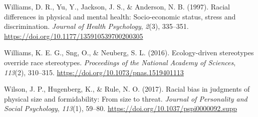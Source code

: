 \documentclass[
  english,
  man]{apa6}
\begin{document}
\leavevmode\hypertarget{ref-Williams1997}{}%
Williams, D. R., Yu, Y., Jackson, J. S., \& Anderson, N. B. (1997). Racial differences in physical and mental health: Socio-economic status, stress and discrimination. \emph{Journal of Health Psychology}, \emph{2}(3), 335--351. \url{https://doi.org/10.1177/135910539700200305}

\leavevmode\hypertarget{ref-Williams2016}{}%
Williams, K. E. G., Sng, O., \& Neuberg, S. L. (2016). Ecology-driven stereotypes override race stereotypes. \emph{Proceedings of the National Academy of Sciences}, \emph{113}(2), 310--315. \url{https://doi.org/10.1073/pnas.1519401113}

\leavevmode\hypertarget{ref-Wilson2017}{}%
Wilson, J. P., Hugenberg, K., \& Rule, N. O. (2017). Racial bias in judgments of physical size and formidability: From size to threat. \emph{Journal of Personality and Social Psychology}, \emph{113}(1), 59--80. \url{https://doi.org/10.1037/pspi0000092.supp}

\endgroup
\end{document}
